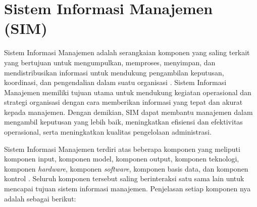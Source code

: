 \section{Sistem Informasi Manajemen (SIM)}
\label{sec:sim}

Sistem Informasi Manajemen adalah serangkaian komponen yang saling terkait yang bertujuan untuk mengumpulkan, memproses, menyimpan, dan mendistribusikan informasi untuk mendukung pengambilan keputusan, koordinasi, dan pengendalian dalam suatu organisasi \cite{armah2024sim}. Sistem Informasi Manajemen memiliki tujuan utama untuk mendukung kegiatan operasional dan strategi organisasi dengan cara memberikan informasi yang tepat dan akurat kepada manajemen. Dengan demikian, SIM dapat membantu manajemen dalam mengambil keputusan yang lebih baik, meningkatkan efisiensi dan efektivitas operasional, serta meningkatkan kualitas pengelolaan administrasi. 

Sistem Informasi Manajemen terdiri atas beberapa komponen yang meliputi komponen input, komponen model, komponen output, komponen teknologi, komponen \emph{hardware}, komponen \emph{software}, komponen basis data, dan komponen kontrol \cite{rusdiana2014sim}. Seluruh komponen tersebut saling berinteraksi satu sama lain untuk mencapai tujuan sistem informasi manajemen. Penjelasan setiap komponen nya adalah sebagai berikut:

